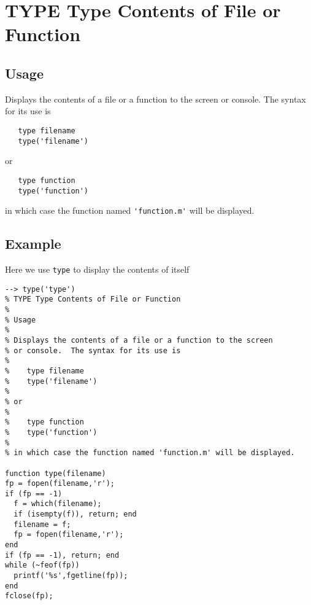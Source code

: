\section{TYPE Type Contents of File or Function}

\subsection{Usage}

Displays the contents of a file or a function to the screen
or console.  The syntax for its use is
\begin{verbatim}
   type filename
   type('filename')
\end{verbatim}
or
\begin{verbatim}
   type function
   type('function')
\end{verbatim}
in which case the function named \verb|'function.m'| will be displayed.
\subsection{Example}

Here we use \verb|type| to display the contents of itself 
\begin{verbatim}
--> type('type')
% TYPE Type Contents of File or Function
% 
% Usage
% 
% Displays the contents of a file or a function to the screen
% or console.  The syntax for its use is
% 
%    type filename
%    type('filename')
% 
% or
% 
%    type function
%    type('function')
% 
% in which case the function named 'function.m' will be displayed.

function type(filename)
fp = fopen(filename,'r');
if (fp == -1)
  f = which(filename);
  if (isempty(f)), return; end
  filename = f;
  fp = fopen(filename,'r');
end
if (fp == -1), return; end
while (~feof(fp))
  printf('%s',fgetline(fp));
end
fclose(fp);
\end{verbatim}
